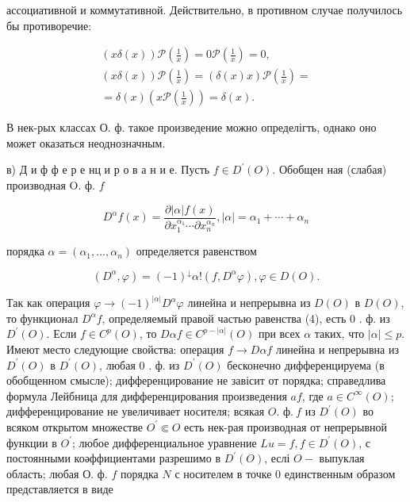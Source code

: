 \documentclass[10pt]{article}
\begin{document}
ассоциативной и коммутативной. Действительно, в противном случае получилось бы противоречие:



\[

\begin{gathered}

(x \delta(x)) \mathscr{P}\left(\frac{1}{x}\right)=0 \mathscr{P}\left(\frac{1}{x}\right)=0, \\

(x \delta(x)) \mathscr{P}\left(\frac{1}{x}\right)=(\delta(x) x) \mathscr{P}\left(\frac{1}{x}\right)= \\

=\delta(x)\left(x \mathscr{P}\left(\frac{1}{x}\right)\right)=\delta(x) .

\end{gathered}

\]



В нек-рых классах О. ф. такое произведение можно определігть, однако оно может оказаться неоднозначным.



в) Д и ф ф е р е нц и р о в а н и е. Пусть $f \in D^{\prime}(O)$. Обобщен ная (слабая) производная O. ф. $f$



\[

D^{\alpha} f(x)=\frac{\partial|\alpha| f(x)}{\partial x_{1}^{\alpha_{1}} \cdots \partial x_{n}^{\alpha_{n}}},|\alpha|=\alpha_{1}+\cdots+\alpha_{n}

\]



порядка $\alpha=\left(\alpha_{1}, \ldots, \alpha_{n}\right)$ определяется равенством



\[

\left(D^{\alpha}, \varphi\right)=(-1)^{\downarrow} \alpha !\left(f, D^{\alpha} \varphi\right), \varphi \in D(O) .

\]



Так как операция $\varphi \rightarrow(-1)^{|\alpha|} D^{\alpha} \varphi$ линейна и непрерывна из $D(O)$ в $D(O)$, то функционал $D^{\alpha} f$, определяемый правой частью равенства (4), есть 0 . ф. из $D^{\prime}(O)$. Если $f \in C^{p}(O)$, то $D \alpha f \in C^{p-|\alpha|}(O)$ при всех $\alpha$ таких, что $|\alpha| \leqslant p$. Имеют место следующие свойства: операция $f \rightarrow D \alpha f$ линейна и непрерывна из $D^{\prime}(O)$ в $D^{\prime}(O)$, любая 0 . ф. из $D^{\prime}(O)$ бесконечно дифференцируема (в обобщенном смысле); дифференцирование не завісит от порядка; справедлива формула Лейбница для дифференцирования произведения $a f$, где $a \in C^{\infty}(O)$; дифференцирование не увеличивает носителя; всякая $O$. $ф . ~ f$ из $D^{\prime}(O)$ во всяком открытом множестве $O^{\prime} \Subset O$ есть нек-рая производная от непрерывной функции в $O^{\prime}$; любое дифференциальное уравнение $L u=f, f \in D^{\prime}(O)$, с постоянными коәффициентами разрешимо в $D^{\prime}(O)$, еслі $O-$ выпуклая область; любая О. ф. $f$ порядка $N$ с носителем в точке 0 единственным образом представляется в виде
\end{document}
